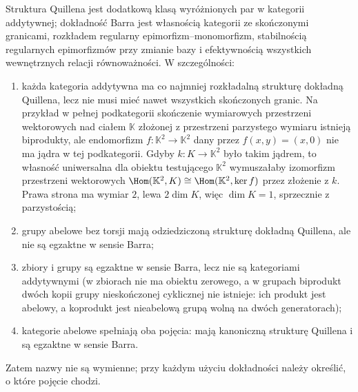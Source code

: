 \begin{uwaga}\label{cat:rem:quillen-barr-comparison}
Struktura Quillena jest dodatkową klasą wyróżnionych par w kategorii addytywnej; dokładność Barra jest własnością kategorii ze skończonymi granicami, rozkładem regularny epimorfizm--monomorfizm, stabilnością regularnych epimorfizmów przy zmianie bazy i efektywnością wszystkich wewnętrznych relacji równoważności. W szczególności:
\begin{enumerate}
 \item każda kategoria addytywna ma co najmniej rozkładalną strukturę dokładną Quillena, lecz nie musi mieć nawet wszystkich skończonych granic. Na przykład w pełnej podkategorii skończenie wymiarowych przestrzeni wektorowych nad ciałem $\mathbb K$ złożonej z przestrzeni parzystego wymiaru istnieją biprodukty, ale endomorfizm $f:\mathbb K^2\to\mathbb K^2$ dany przez $f(x,y)=(x,0)$ nie ma jądra w tej podkategorii. Gdyby $k:K\to\mathbb K^2$ było takim jądrem, to własność uniwersalna dla obiektu testującego $\mathbb K^2$ wymuszałaby izomorfizm przestrzeni wektorowych $\Hom(\mathbb K^2,K)\cong\Hom(\mathbb K^2,\ker f)$ przez złożenie z $k$. Prawa strona ma wymiar $2$, lewa $2\dim K$, więc $\dim K=1$, sprzecznie z parzystością;
 \item grupy abelowe bez torsji mają odziedziczoną strukturę dokładną Quillena, ale nie są egzaktne w sensie Barra;
 \item zbiory i grupy są egzaktne w sensie Barra, lecz nie są kategoriami addytywnymi (w zbiorach nie ma obiektu zerowego, a w grupach biprodukt dwóch kopii grupy nieskończonej cyklicznej nie istnieje: ich produkt jest abelowy, a koprodukt jest nieabelową grupą wolną na dwóch generatorach);
 \item kategorie abelowe spełniają oba pojęcia: mają kanoniczną strukturę Quillena i są egzaktne w sensie Barra.
\end{enumerate}
Zatem nazwy nie są wymienne; przy każdym użyciu dokładności należy określić, o które pojęcie chodzi.
\end{uwaga}

